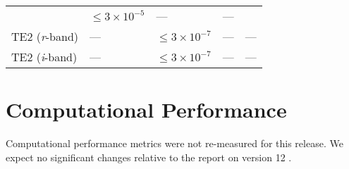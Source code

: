 \documentclass[DM,toc]{lsstdoc}
\begin{document}
\begin{longtable}[]{@{}lllll@{}}
\begin{minipage}[t]{0.05\columnwidth}
\end{minipage} & \begin{minipage}[t]{0.24\columnwidth}\raggedright\strut
\(\leq 3\times 10^{-5}\)\strut
\end{minipage} & \begin{minipage}[t]{0.21\columnwidth}\raggedright\strut
---\strut
\end{minipage} & \begin{minipage}[t]{0.22\columnwidth}\raggedright\strut
---\strut
\end{minipage}\tabularnewline
\begin{minipage}[t]{0.13\columnwidth}\raggedright\strut
TE2 (\emph{r}-band)\strut
\end{minipage} & \begin{minipage}[t]{0.05\columnwidth}\raggedright\strut
---\strut
\end{minipage} & \begin{minipage}[t]{0.24\columnwidth}\raggedright\strut
\(\leq 3\times 10^{-7}\)\strut
\end{minipage} & \begin{minipage}[t]{0.21\columnwidth}\raggedright\strut
---\strut
\end{minipage} & \begin{minipage}[t]{0.22\columnwidth}\raggedright\strut
---\strut
\end{minipage}\tabularnewline
\begin{minipage}[t]{0.13\columnwidth}\raggedright\strut
TE2 (\emph{i}-band)\strut
\end{minipage} & \begin{minipage}[t]{0.05\columnwidth}\raggedright\strut
---\strut
\end{minipage} & \begin{minipage}[t]{0.24\columnwidth}\raggedright\strut
\(\leq 3\times 10^{-7}\)\strut
\end{minipage} & \begin{minipage}[t]{0.21\columnwidth}\raggedright\strut
---\strut
\end{minipage} & \begin{minipage}[t]{0.22\columnwidth}\raggedright\strut
---\strut
\end{minipage}\tabularnewline
\bottomrule
\end{longtable}

\section{Computational Performance}\label{computational-performance}

Computational performance metrics were not re-measured for this release.
We expect no significant changes relative to the
report on version 12 .



\end{document}
